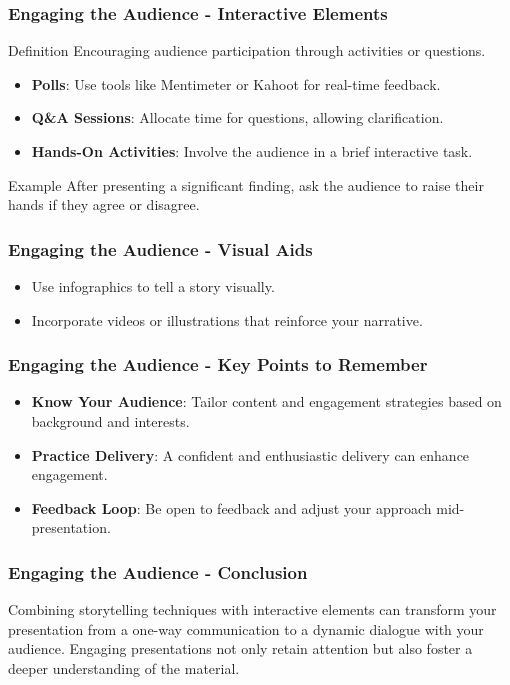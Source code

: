 \documentclass[aspectratio=169]{beamer}
\begin{document}
\begin{frame}[fragile]
    \frametitle{Engaging the Audience - Interactive Elements}
    \begin{block}{Definition}
        Encouraging audience participation through activities or questions.
    \end{block}
    \begin{itemize}
        \item \textbf{Polls}: Use tools like Mentimeter or Kahoot for real-time feedback.
        \item \textbf{Q\&A Sessions}: Allocate time for questions, allowing clarification.
        \item \textbf{Hands-On Activities}: Involve the audience in a brief interactive task.
    \end{itemize}
    \begin{block}{Example}
        After presenting a significant finding, ask the audience to raise their hands if they agree or disagree.
    \end{block}
\end{frame}

\begin{frame}[fragile]
    \frametitle{Engaging the Audience - Visual Aids}
    \begin{itemize}
        \item Use infographics to tell a story visually.
        \item Incorporate videos or illustrations that reinforce your narrative.
    \end{itemize}
\end{frame}

\begin{frame}[fragile]
    \frametitle{Engaging the Audience - Key Points to Remember}
    \begin{itemize}
        \item \textbf{Know Your Audience}: Tailor content and engagement strategies based on background and interests.
        \item \textbf{Practice Delivery}: A confident and enthusiastic delivery can enhance engagement.
        \item \textbf{Feedback Loop}: Be open to feedback and adjust your approach mid-presentation.
    \end{itemize}
\end{frame}

\begin{frame}[fragile]
    \frametitle{Engaging the Audience - Conclusion}
    Combining storytelling techniques with interactive elements can transform your presentation from a one-way communication to a dynamic dialogue with your audience. Engaging presentations not only retain attention but also foster a deeper understanding of the material.
\end{frame}
\end{document}
